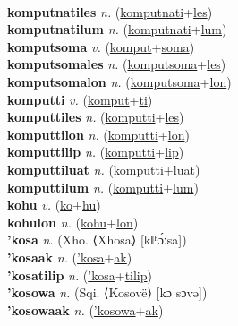  \label{komputnati} \\
\textbf{komputnatiles} \textit{n.} (\hyperref[komputnati]{komputnati}+\hyperref[les]{les})
 \label{komputnatiles} \\
\textbf{komputnatilum} \textit{n.} (\hyperref[komputnati]{komputnati}+\hyperref[lum]{lum})
 \label{komputnatilum} \\
\textbf{komputsoma} \textit{v.} (\hyperref[komput]{komput}+\hyperref[soma]{soma})
 \label{komputsoma} \\
\textbf{komputsomales} \textit{n.} (\hyperref[komputsoma]{komputsoma}+\hyperref[les]{les})
 \label{komputsomales} \\
\textbf{komputsomalon} \textit{n.} (\hyperref[komputsoma]{komputsoma}+\hyperref[lon]{lon})
 \label{komputsomalon} \\
\textbf{komputti} \textit{v.} (\hyperref[komput]{komput}+\hyperref[ti]{ti})
 \label{komputti} \\
\textbf{komputtiles} \textit{n.} (\hyperref[komputti]{komputti}+\hyperref[les]{les})
 \label{komputtiles} \\
\textbf{komputtilon} \textit{n.} (\hyperref[komputti]{komputti}+\hyperref[lon]{lon})
 \label{komputtilon} \\
\textbf{komputtilip} \textit{n.} (\hyperref[komputti]{komputti}+\hyperref[lip]{lip})
 \label{komputtilip} \\
\textbf{komputtiluat} \textit{n.} (\hyperref[komputti]{komputti}+\hyperref[luat]{luat})
 \label{komputtiluat} \\
\textbf{komputtilum} \textit{n.} (\hyperref[komputti]{komputti}+\hyperref[lum]{lum})
 \label{komputtilum} \\
\textbf{kohu} \textit{v.} (\hyperref[ko]{ko}+\hyperref[hu]{hu})
 \label{kohu} \\
\textbf{kohulon} \textit{n.} (\hyperref[kohu]{kohu}+\hyperref[lon]{lon})
 \label{kohulon} \\
\textbf{'kosa} \textit{n.} (Xho. ⟨Xhosa⟩ [kǁʰɔ́ːsa])
 \label{'kosa} \\
\textbf{'kosaak} \textit{n.} (\hyperref['kosa]{'kosa}+\hyperref[ak]{ak})
 \label{'kosaak} \\
\textbf{'kosatilip} \textit{n.} (\hyperref['kosa]{'kosa}+\hyperref[tilip]{tilip})
 \label{'kosatilip} \\
\textbf{'kosowa} \textit{n.} (Sqi. ⟨Kosovë⟩ [kɔˈsɔvə])
 \label{'kosowa} \\
\textbf{'kosowaak} \textit{n.} (\hyperref['kosowa]{'kosowa}+\hyperref[ak]{ak})
 \label{'kosowaak} \\
